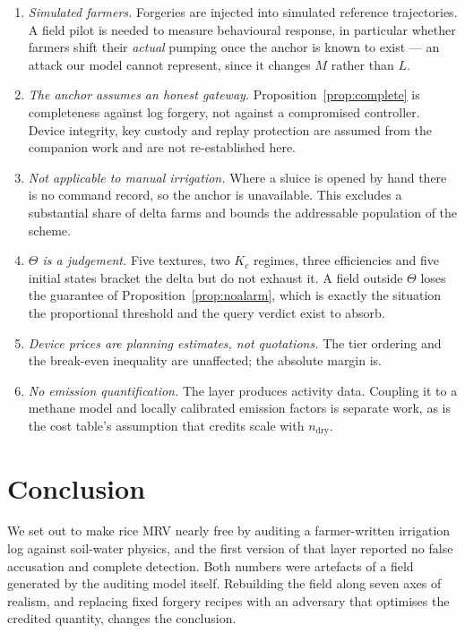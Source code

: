 \documentclass[journal]{IEEEtran}
\begin{document}
\begin{enumerate}
\item \emph{Simulated farmers.} Forgeries are injected into simulated reference
trajectories. A field pilot is needed to measure behavioural response, in
particular whether farmers shift their \emph{actual} pumping once the anchor is
known to exist --- an attack our model cannot represent, since it changes $M$
rather than $L$.
\item \emph{The anchor assumes an honest gateway.}
Proposition~\ref{prop:complete} is completeness against log forgery, not against
a compromised controller. Device integrity, key custody and replay protection
are assumed from the companion work and are not re-established here.
\item \emph{Not applicable to manual irrigation.} Where a sluice is opened by
hand there is no command record, so the anchor is unavailable. This excludes a
substantial share of delta farms and bounds the addressable population of the
scheme.
\item \emph{$\Theta$ is a judgement.} Five textures, two $K_c$ regimes, three
efficiencies and five initial states bracket the delta but do not exhaust it. A
field outside $\Theta$ loses the guarantee of Proposition~\ref{prop:noalarm},
which is exactly the situation the proportional threshold and the query verdict
exist to absorb.
\item \emph{Device prices are planning estimates, not quotations.} The tier
ordering and the break-even inequality are unaffected; the absolute margin is.
\item \emph{No emission quantification.} The layer produces activity data.
Coupling it to a methane model and locally calibrated emission factors is
separate work, as is the cost table's assumption that credits scale with
$n_{\mathrm{dry}}$.
\end{enumerate}

\section{Conclusion}

We set out to make rice MRV nearly free by auditing a farmer-written irrigation
log against soil-water physics, and the first version of that layer reported no
false accusation and complete detection. Both numbers were artefacts of a field
generated by the auditing model itself. Rebuilding the field along seven axes of
realism, and replacing fixed forgery recipes with an adversary that optimises the
credited quantity, changes the conclusion.
\end{document}
